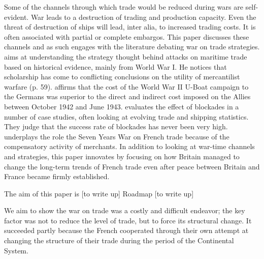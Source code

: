 \documentclass[12pt,a4paper,notitlepage,english]{article}
\begin{document}
Some of the channels through which trade would be reduced during wars are self-evident.
War leads to a destruction of trading and production capacity.
Even the threat of destruction of ships will lead, inter alia, to increased trading costs.
It is often associated with partial or complete embargos.
This paper discusses these channels and as such engages with the literature debating war on trade strategies.
\cite{Tracy1991} aims at understanding the strategy thought behind attacks on maritime trade based on historical evidence, mainly from World War I.
He notices that scholarship has come to conflicting conclusions on the utility of mercantilist warfare (p. 59).
\cite{Pugh1986} affirms that the cost of the World War II U-Boat campaign to the Germans was superior to the direct and indirect cost imposed on the Allies between October 1942 and June 1943.
\cite{Davis2006} evaluates the effect of blockades in a number of case studies, often looking at evolving trade and shipping statistics.
They judge that the success rate of blockades has never been very high.
\cite{Riley1986} underplays the role the Seven Years War on French trade because of the compensatory activity of merchants.
In addition to looking at war-time channels and strategies, this paper innovates by focusing on how Britain managed to change the long-term trends of French trade even after peace between Britain and France became firmly established.

The aim of this paper is [to write up]
Roadmap [to write up]

We aim to show the war on trade was a costly and difficult endeavor; the key factor was not to reduce the level of trade, but to force its structural change.
It succeeded partly because the French cooperated through their own attempt at changing the structure of their trade during the period of the Continental System.

\end{document}
